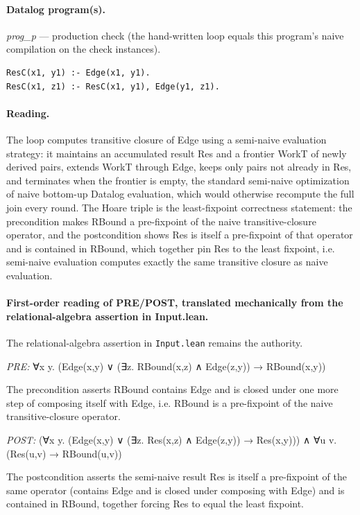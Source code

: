 \documentclass[10pt]{article}
\begin{document}
\paragraph{Datalog program(s).}

{\raggedright\textit{prog\_p} --- production check (the hand-written loop equals this program's naive compilation on the check instances).\par}

\begin{Verbatim}[fontsize=\scriptsize,breaklines=true,breakanywhere=true,frame=single,framesep=1.5mm]
ResC(x1, y1) :- Edge(x1, y1).
ResC(x1, z1) :- ResC(x1, y1), Edge(y1, z1).
\end{Verbatim}

\paragraph{Reading.} The loop computes transitive closure of Edge using a semi-naive evaluation strategy: it maintains an accumulated result Res and a frontier WorkT of newly derived pairs, extends WorkT through Edge, keeps only pairs not already in Res, and terminates when the frontier is empty, the standard semi-naive optimization of naive bottom-up Datalog evaluation, which would otherwise recompute the full join every round. The Hoare triple is the least-fixpoint correctness statement: the precondition makes RBound a pre-fixpoint of the naive transitive-closure operator, and the postcondition shows Res is itself a pre-fixpoint of that operator and is contained in RBound, which together pin Res to the least fixpoint, i.e. semi-naive evaluation computes exactly the same transitive closure as naive evaluation.

\paragraph{First-order reading of PRE/POST, translated mechanically from the relational-algebra assertion in Input.lean.} The relational-algebra assertion in \texttt{Input.lean} remains the authority.

\textit{PRE:} ∀x y. (Edge(x,y) ∨ (∃z. RBound(x,z) ∧ Edge(z,y)) → RBound(x,y))\par The precondition asserts RBound contains Edge and is closed under one more step of composing itself with Edge, i.e. RBound is a pre-fixpoint of the naive transitive-closure operator.

\textit{POST:} (∀x y. (Edge(x,y) ∨ (∃z. Res(x,z) ∧ Edge(z,y)) → Res(x,y))) ∧ ∀u v. (Res(u,v) → RBound(u,v))\par The postcondition asserts the semi-naive result Res is itself a pre-fixpoint of the same operator (contains Edge and is closed under composing with Edge) and is contained in RBound, together forcing Res to equal the least fixpoint.
\end{document}
